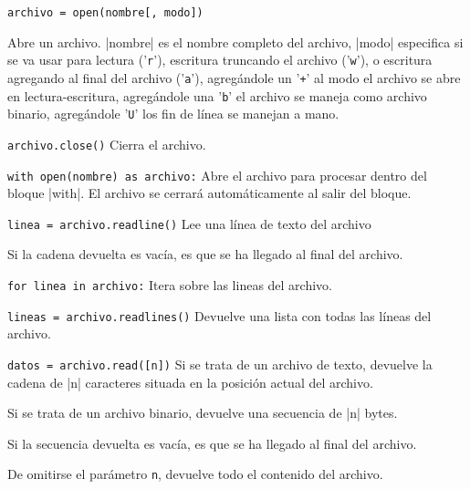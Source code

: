 \begin{referencia_python}

\begin{sintaxis}{\lstinline{archivo = open(nombre[, modo])}}

Abre un archivo. |nombre| es el nombre completo del archivo,
|modo| especifica si se va usar para lectura ('\verb!r!'), escritura
truncando el archivo ('\verb!w!'), o escritura agregando al final del archivo
('\verb!a!'), agregándole un '\verb!+!' al modo el archivo se abre en
lectura-escritura, agregándole una '\verb!b!' el archivo se maneja como archivo
binario, agregándole '\verb!U!' los fin de línea se manejan a mano.
\end{sintaxis}

\begin{sintaxis}{\lstinline!archivo.close()!}
Cierra el archivo.
\end{sintaxis}

\begin{sintaxis}{\lstinline!with open(nombre) as archivo:!}
Abre el archivo para procesar dentro del bloque |with|. El archivo se
cerrará automáticamente al salir del bloque.
\end{sintaxis}

\begin{sintaxis}{\lstinline!linea = archivo.readline()!}
Lee una línea de texto del archivo

Si la cadena devuelta es vacía, es que se ha llegado al
final del archivo.
\end{sintaxis}

\begin{sintaxis}{\lstinline!for linea in archivo:!}
Itera sobre las lineas del archivo.
\end{sintaxis}

\begin{sintaxis}{\lstinline!lineas = archivo.readlines()!}
Devuelve una lista con todas las líneas del archivo.
\end{sintaxis}

\begin{sintaxis}{\lstinline!datos = archivo.read([n])!}
Si se trata de un archivo de texto, devuelve la cadena de |n|
caracteres situada en la posición actual del archivo.

Si se trata de un archivo binario, devuelve una secuencia de |n| bytes.

Si la secuencia devuelta es vacía, es que se ha llegado al
final del archivo.

De omitirse el parámetro \lstinline!n!, devuelve todo el contenido del archivo.
\end{sintaxis}


\end{referencia_python}
